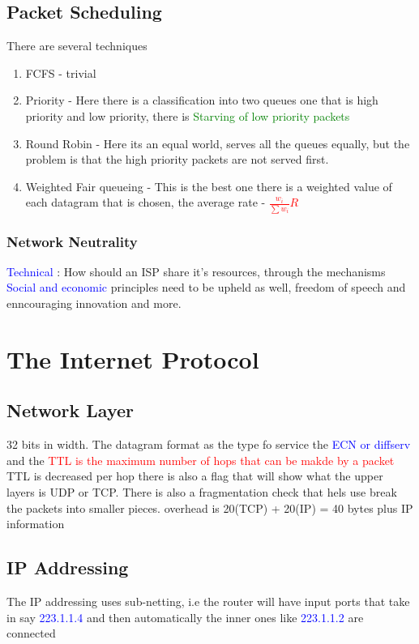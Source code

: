 \subsection{Packet Scheduling}
There are several techniques
\begin{enumerate}
\item  FCFS - trivial
\item Priority - Here there is a classification into two queues one that is high priority and low priority, there is \textcolor{green}{Starving of low priority packets}
\item Round Robin - Here its an equal world, serves all the queues equally, but the problem is that the high priority packets are not served first.
\item Weighted Fair queueing - \colorbox{BurntOrange}{This is the best one} there is a weighted value of each datagram that is chosen, the average rate - \textcolor{red}{$\frac{w_i}{\sum w_i} R$}
\end{enumerate}
\subsubsection{Network Neutrality}
\textcolor{blue}{Technical} : How should an ISP share it's resources, through the mechanisms
\textcolor{blue}{Social and economic} principles need to be upheld as well, freedom of speech and enncouraging innovation and more.
\\
\lineo
\section{The Internet Protocol}

\subsection{Network Layer}
32 bits in width.
The datagram format as the type fo service the \textcolor{blue}{ECN or diffserv} and the \textcolor{red}{TTL is the maximum number of hops that can be makde by a packet}
\colorbox{BurntOrange}{TTL is decreased per hop}
there is also a flag that will show what the upper layers is UDP or TCP.
There is also a fragmentation check that hels use break the packets into smaller pieces.
overhead is 20(TCP) + 20(IP) = 40 bytes plus IP information
\\
\lineo
\subsection{IP Addressing}
The IP addressing uses sub-netting, i.e the router will have input ports that
take in say \textcolor{blue}{223.1.1.4} and then automatically the inner ones like \textcolor{blue}{223.1.1.2} are connected
